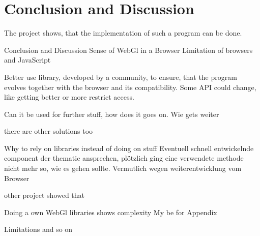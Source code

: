 \chapter{Conclusion and Discussion }


The project shows, that the implementation of such a program can be done.



Conclusion and Discussion 
Sense of WebGl in a Browser
Limitation of browsers and JavaScript




Better use library, developed by a community, to ensure, that the program evolves together with the browser and its compatibility. Some API could change, like getting better or more restrict access.

Can it be used for further stuff, how does it goes on. Wie gets weiter


there are other solutions too

 
Why to rely on libraries instead of doing on stuff
Eventuell schnell entwickelnde component der thematic ansprechen, plötzlich ging eine verwendete methode nicht mehr so, wie es gehen sollte. Vermutlich wegen weiterentwicklung vom Browser

other project showed that





Doing a own WebGl libraries shows complexity
My be for Appendix


Limitations and so on

